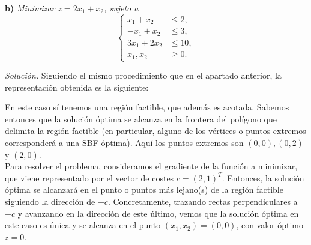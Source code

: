 \documentclass[11pt,a4paper]{article}
\begin{document}
\textbf{b)} \emph{Minimizar \( z = 2x_{1} + x_{2} \), sujeto a}
\[
\begin{cases}
  x_{1} + x_{2} &\leq 2,\\
  -x_{1} + x_{2} &\leq 3,\\
  3x_{1} + 2x_{2} &\leq 10,\\
  x_{1}, x_{2} &\geq 0.
\end{cases}
\]

\textit{Solución.} Siguiendo el mismo procedimiento que en el apartado anterior, la representación obtenida es la siguiente:

\newpage

\begin{figure}[h!]
\centering
{}
\end{figure}

En este caso sí tenemos una región factible, que además es acotada. Sabemos entonces que la solución óptima se alcanza en la frontera del polígono que delimita la región factible (en particular, alguno de los vértices o puntos extremos corresponderá a una SBF óptima). Aquí los puntos extremos son $(0,0), (0,2)$ y $(2,0)$.\\

Para resolver el problema, consideramos el gradiente de la función a minimizar, que viene representado por el vector de costes $c=(2, 1)^T$. Entonces, la solución óptima se alcanzará en el punto o puntos más lejano(s) de la región factible siguiendo la dirección de $-c$. Concretamente, trazando rectas perpendiculares a $-c$ y avanzando en la dirección de este último, vemos que la solución óptima en este caso es única y se alcanza en el punto $(x_1, x_2)=(0, 0)$, con valor óptimo $z=0$.\\
\end{document}
